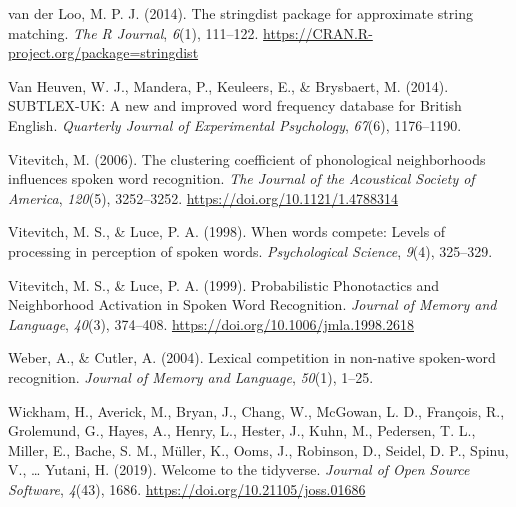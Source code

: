 \documentclass[
  man,
  longtable,
  nolmodern,
  notxfonts,
  notimes,
  colorlinks=true,linkcolor=blue,citecolor=blue,urlcolor=blue]{apa7}
\newlength{\cslhangindent}
\newenvironment{CSLReferences}[2] %
 {\begin{list}{}{%
  \setlength{\itemindent}{0pt}
  \setlength{\leftmargin}{0pt}
  \setlength{\parsep}{0pt}
  \ifodd #1
   \setlength{\leftmargin}{\cslhangindent}
   \setlength{\itemindent}{-1\cslhangindent}
  \fi
  \setlength{\itemsep}{#2\baselineskip}}}
 {\end{list}}
\begin{document}
\begin{CSLReferences}{1}{0}
van der Loo, M. P. J. (2014). The stringdist package for approximate
string matching. \emph{The R Journal}, \emph{6}(1), 111--122.
\url{https://CRAN.R-project.org/package=stringdist}

Van Heuven, W. J., Mandera, P., Keuleers, E., \& Brysbaert, M. (2014).
{SUBTLEX-UK}: {A} new and improved word frequency database for {British
English}. \emph{Quarterly Journal of Experimental Psychology},
\emph{67}(6), 1176--1190.

Vitevitch, M. (2006). The clustering coefficient of phonological
neighborhoods influences spoken word recognition. \emph{The Journal of
the Acoustical Society of America}, \emph{120}(5), 3252--3252.
\url{https://doi.org/10.1121/1.4788314}

Vitevitch, M. S., \& Luce, P. A. (1998). When words compete: Levels of
processing in perception of spoken words. \emph{Psychological Science},
\emph{9}(4), 325--329.

Vitevitch, M. S., \& Luce, P. A. (1999). Probabilistic {Phonotactics}
and {Neighborhood Activation} in {Spoken Word Recognition}.
\emph{Journal of Memory and Language}, \emph{40}(3), 374--408.
\url{https://doi.org/10.1006/jmla.1998.2618}

Weber, A., \& Cutler, A. (2004). Lexical competition in non-native
spoken-word recognition. \emph{Journal of Memory and Language},
\emph{50}(1), 1--25.

Wickham, H., Averick, M., Bryan, J., Chang, W., McGowan, L. D.,
François, R., Grolemund, G., Hayes, A., Henry, L., Hester, J., Kuhn, M.,
Pedersen, T. L., Miller, E., Bache, S. M., Müller, K., Ooms, J.,
Robinson, D., Seidel, D. P., Spinu, V., \ldots{} Yutani, H. (2019).
Welcome to the tidyverse. \emph{Journal of Open Source Software},
\emph{4}(43), 1686. \url{https://doi.org/10.21105/joss.01686}

\end{CSLReferences}

\appendix

\section{}\label{}
\end{document}
